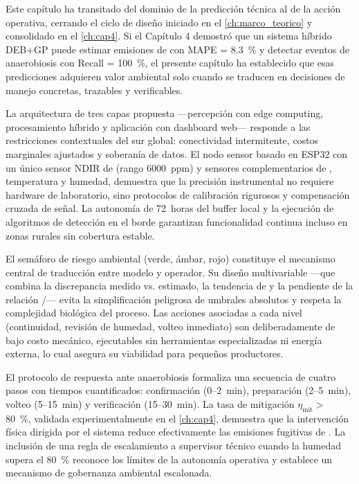 Este capítulo ha transitado del dominio de la predicción técnica al de la acción operativa, cerrando el ciclo de diseño iniciado en el \cref{ch:marco_teorico} y consolidado en el \cref{ch:cap4}. Si el Capítulo 4 demostró que un sistema híbrido DEB+GP puede estimar emisiones de  con MAPE = \num{8.3}~\% y detectar eventos de anaerobiosis con Recall = \num{100}~\%, el presente capítulo ha establecido que esas predicciones adquieren valor ambiental solo cuando se traducen en decisiones de manejo concretas, trazables y verificables.

La arquitectura de tres capas propuesta —percepción con edge computing, procesamiento híbrido y aplicación con dashboard web— responde a las restricciones contextuales del sur global: conectividad intermitente, costos marginales ajustados y soberanía de datos. El nodo sensor basado en ESP32 con un único sensor NDIR de  (rango \num{6000}~ppm) y sensores complementarios de , temperatura y humedad, demuestra que la precisión instrumental no requiere hardware de laboratorio, sino protocolos de calibración rigurosos y compensación cruzada de señal. La autonomía de \num{72}~horas del buffer local y la ejecución de algoritmos de detección en el borde garantizan funcionalidad continua incluso en zonas rurales sin cobertura estable.

El semáforo de riesgo ambiental (verde, ámbar, rojo) constituye el mecanismo central de traducción entre modelo y operador. Su diseño multivariable —que combina la discrepancia  medido vs. estimado, la tendencia de  y la pendiente de la relación /— evita la simplificación peligrosa de umbrales absolutos y respeta la complejidad biológica del proceso. Las acciones asociadas a cada nivel (continuidad, revisión de humedad, volteo inmediato) son deliberadamente de bajo costo mecánico, ejecutables sin herramientas especializadas ni energía externa, lo cual asegura su viabilidad para pequeños productores.

El protocolo de respuesta ante anaerobiosis formaliza una secuencia de cuatro pasos con tiempos cuantificados: confirmación (\num{0}--\num{2}~min), preparación (\num{2}--\num{5}~min), volteo (\num{5}--\num{15}~min) y verificación (\num{15}--\num{30}~min). La tasa de mitigación $\eta_{\text{mit}} >$ \num{80}~\%, validada experimentalmente en el \cref{ch:cap4}, demuestra que la intervención física dirigida por el sistema reduce efectivamente las emisiones fugitivas de . La inclusión de una regla de escalamiento a supervisor técnico cuando la humedad supera el \num{80}~\% reconoce los límites de la autonomía operativa y establece un mecanismo de gobernanza ambiental escalonada.

